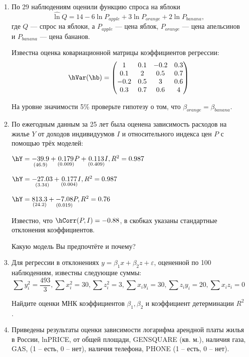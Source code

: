 \begin{enumerate}

\item По 29 наблюдениям оценили функцию спроса на яблоки
\[
\widehat\ln Q = 14 -6 \ln P_{apple} + 3 \ln P_{orange} + 2 \ln P_{banana},
\]
где $Q$ — спрос на яблоки, а $P_{apple}$ — цена яблок, $P_{orange}$ — цена апельсинов и $P_{banana}$ — цена бананов.

Известна оценка ковариационной матрицы коэффициентов регрессии:
\[
\hVar(\hb) =
\begin{pmatrix}
1 & 0.1 & -0.2 & 0.3 \\
0.1 & 2 & 0.5 & 0.7 \\
-0.2 & 0.5 & 3 & 0.6 \\
0.3 & 0.7 & 0.6 &  4
\end{pmatrix}
\]

На уровне значимости 5\% проверьте гипотезу о том, что
$\beta_{orange}=\beta_{banana}$.


\item По ежегодным данным за 25 лет была оценена зависимость расходов на жилье $Y$ от доходов индивидуумов $I$ и относительного индекса цен $P$ с помощью трёх моделей:

$\hY = \underset{(46.9)}{-39.9} + \underset{(0.009)}{0.179} P + \underset{(0.409)}{0.113} I, R^2 = 0.987$

$\hY = \underset{(3.34)}{-27.03} + \underset{(0.004)}{0.177} I, R^2 = 0.987$

$\hY = \underset{(24.2)}{813.3} + \underset{(0.019)}{-7.08} P, R^2 = 0.76$

Известно, что $\hCorr (P, I) = -0.88$, в скобках указаны стандартные отклонения коэффициентов.

Какую модель Вы предпочтёте и почему?


\item Для регрессии в отклонениях $y = \beta_1 x + \beta_2 z + \varepsilon$, оцененной по 100 наблюдениям, известны следующие суммы:
\[
\sum y^2_i = \frac{493}{3}, \sum x_i^2 = 30, \sum z_i^2 = 3, \sum x_i y_i = 30, \sum z_i y_i = 20, \sum x_i z_i = 0
\]

Найдите оценки МНК коэффициентов $\beta_1, \beta_2$ и коэффициент детерминации $R^2$.


\item Приведены результаты оценки зависимости логарифма арендной платы жилья в России, lnPRICE, от общей площади,  GENSQUARE (кв. м.), наличия газа, GAS, (1 – есть, 0 – нет), наличия телефона, PHONE (1 – есть, 0 – нет).


\end{enumerate}
